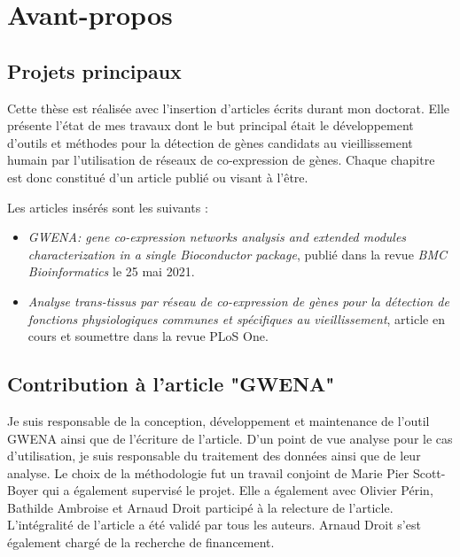 \chapter*{Avant-propos}         %


\section{Projets principaux}

Cette thèse est réalisée avec l'insertion d’articles écrits durant mon doctorat. Elle présente l’état de mes travaux dont le but principal était le développement d’outils et méthodes pour la détection de gènes candidats au vieillissement humain par l'utilisation de réseaux de co-expression de gènes. Chaque chapitre est donc constitué d'un article publié ou visant à l'être.

Les articles insérés sont les suivants :
\begin{itemize}
    \item \textit{GWENA: gene co-expression networks analysis and extended modules characterization in a single Bioconductor package}, publié dans la revue \textit{BMC Bioinformatics} le 25 mai 2021.
    \item \textit{Analyse trans-tissus par réseau de co-expression de gènes pour la détection de fonctions physiologiques communes et spécifiques au vieillissement}, article en cours et soumettre dans la revue PLoS One.
\end{itemize}


\section{Contribution à l'article "GWENA"}

Je suis responsable de la conception, développement et maintenance de l'outil GWENA ainsi que de l'écriture de l'article. D'un point de vue analyse pour le cas d'utilisation, je suis responsable du traitement des données ainsi que de leur analyse. Le choix de la méthodologie fut un travail conjoint de Marie Pier Scott-Boyer qui a également supervisé le projet. Elle a également avec Olivier Périn, Bathilde Ambroise et Arnaud Droit participé à la relecture de l'article. L'intégralité de l'article a été validé par tous les auteurs. Arnaud Droit s'est également chargé de la recherche de financement.


